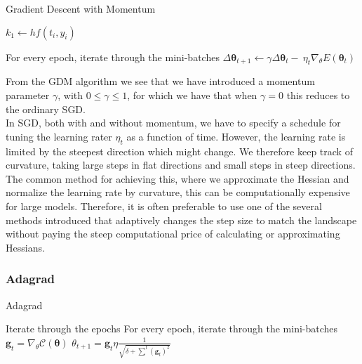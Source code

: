 \documentclass[english,notitlepage,reprint,nofootinbib]{revtex4–2}  %
\begin{document}
\begin{algorithm}[H]
    \caption{Gradient Descent with Momentum}\label{algo:GDM}
    \begin{algorithmic}
        \State $k_1 \leftarrow hf(t_i,y_i)$  
         
        
        \State For every epoch, iterate through the mini-batches 
        \State $\Delta \boldsymbol{\theta}_{t+1} \leftarrow 
                \gamma \Delta \boldsymbol{\theta}_t -\ \eta_{t}\nabla_\theta E(\boldsymbol{\theta}_t)$ 
        \EndWhile
    \end{algorithmic}
\end{algorithm}
From the GDM algorithm we see that we have introduced a momentum parameter $\gamma$, with $0\leq\gamma\leq 1$, for which we have that when $\gamma = 0$ this reduces to the ordinary SGD. 
\vspace{3mm}
\\ 
In SGD, both with and without momentum, we have to specify a schedule for tuning the learning rater $\eta_t$ as a function of time. However, the learning rate is limited by the steepest direction which might change. We therefore keep track of curvature, taking large steps in flat directions and small steps in steep directions. 
The common method for achieving this, where we approximate the Hessian and normalize the learning rate by curvature, this can be computationally expensive for large models. Therefore, it is often preferable to use one of the several methods introduced that adaptively changes the step size to match the landscape without paying the steep computational price of calculating or approximating Hessians.

\subsubsection{Adagrad} %

\begin{algorithm}[H]
    \caption{Adagrad}\label{algo: Adagrad}
    \begin{algorithmic}
        \State Iterate through the epochs 
        \State For every epoch, iterate through the mini-batches 
        \State $\mathbf{g}_t =\nabla_\theta \mathcal{C}(\boldsymbol{\theta})$
        \State $\theta_{t+1} = \mathbf{g}_t \eta \frac{1}{\sqrt{\delta+ \sum^t(\mathbf{g}_t)^2}}$
    \end{algorithmic}
\end{algorithm}
\end{document}
